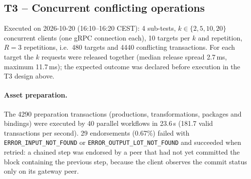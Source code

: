 \subsection{T3 -- Concurrent conflicting operations}
Executed on 2026-10-20 (16:10--16:20 CEST): 4
sub-tests, $k \in \{2, 5, 10, 20\}$ concurrent clients (one gRPC connection each), 10
targets per $k$ and repetition, $R=3$ repetitions, i.e.\ 480 targets and 4440
conflicting transactions. For each target the $k$ requests were released together (median release spread
2.7\,ms, maximum 11.7\,ms); the expected outcome was
declared before execution in the T3 design above.

\paragraph{Asset preparation.} The 4290 preparation transactions (productions, transformations,
packages and bindings) were executed by 40 parallel workflows in 23.6\,s
(181.7 valid transactions per second). 29 endorsements
(0.67\%) failed with \texttt{ERROR\_INPUT\_NOT\_FOUND} or
\texttt{ERROR\_OUTPUT\_LOT\_NOT\_FOUND} and succeeded when retried: a chained step was endorsed by a peer that
had not yet committed the block containing the previous step, because the client observes the commit status
only on its gateway peer.

